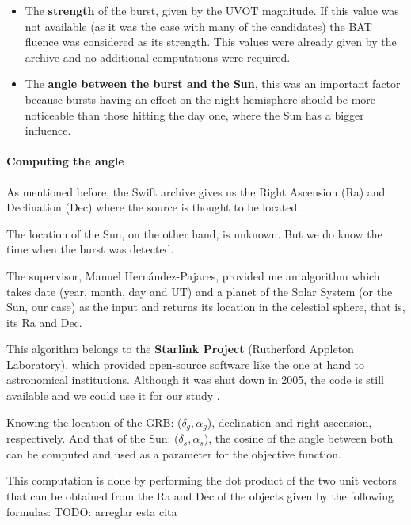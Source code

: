 \begin{itemize}

\item The \textbf{strength} of the burst, given by the UVOT magnitude. If this value was not available (as it was the case with many of the candidates) the BAT fluence was considered as its strength. This values were already given by the archive and no additional computations were required.

\item The \textbf{angle between the burst and the Sun}, this was an important factor because bursts having an effect on the night hemisphere should be more noticeable than those hitting the day one, where the Sun has a bigger influence.

\end{itemize}

\paragraph{Computing the angle}

As mentioned before, the Swift archive gives us the Right Ascension (Ra) and Declination (Dec) where the source is thought to be located.

The location of the Sun, on the other hand, is unknown. But we do know the time when the burst was detected.

The supervisor, Manuel Hernández-Pajares, provided me an algorithm which takes date (year, month, day and UT) and a planet of the Solar System (or the Sun, our case) as the input and returns its location in the celestial sphere, that is, its Ra and Dec. 

This algorithm belongs to the \textbf{Starlink Project} (Rutherford Appleton Laboratory), which provided open-source software like the one at hand to astronomical institutions. Although it was shut down in 2005, the code is still available and we could use it for our study \cite{starlinkproject}.

Knowing the location of the GRB: ($\delta_{g}, \alpha_{g}$), declination and right ascension, respectively. And that of the Sun: ($\delta_{s}, \alpha_{s}$), the cosine of the angle between both can be computed and used as a parameter for the objective function.

This computation is done by performing the dot product of the two unit vectors that can be obtained from the Ra and Dec of the objects given by the following formulas: \cite{de donde salen las formulas}  TODO: arreglar esta cita

